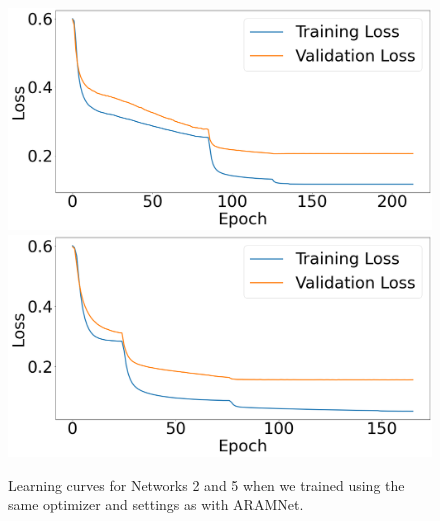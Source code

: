 \begin{figure}
    \centering
    \begin{minipage}{\textwidth}      
        \includegraphics[width=.49\textwidth]{figures/explore-train-loss/network-2.png}\hfill
        \includegraphics[width=.49\textwidth]{figures/explore-train-loss/network-5.png}
    \end{minipage}
    \caption{Learning curves for Networks 2 and 5 when we trained using the same optimizer and settings as with ARAMNet.}
    \label{Figure:Training-Loss-2-and-5}
\end{figure}